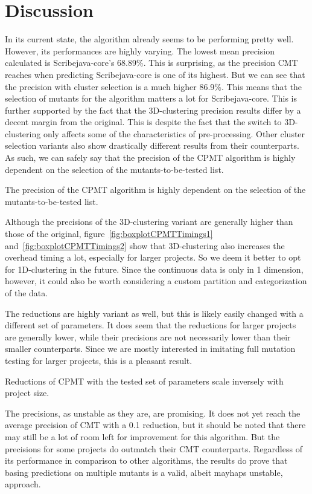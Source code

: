\documentclass[twoside]{uva-inf-bachelor-thesis}
\begin{document}
\section{Discussion}
In its current state, the algorithm already seems to be performing pretty well. However, its performances are highly varying. The lowest mean precision calculated is Scribejava-core's 68.89\%. This is surprising, as the precision CMT reaches when predicting Scribejava-core is one of its highest. But we can see that the precision with cluster selection is a much higher 86.9\%. This means that the selection of mutants for the algorithm matters a lot for Scribejava-core. This is further supported by the fact that the 3D-clustering precision results differ by a decent margin from the original. This is despite the fact that the switch to 3D-clustering only affects some of the characteristics of pre-processing. Other cluster selection variants also show drastically different results from their counterparts. As such, we can safely say that the precision of the CPMT algorithm is highly dependent on the selection of the mutants-to-be-tested list.
\begin{finding}
    The precision of the CPMT algorithm is highly dependent on the selection of the mutants-to-be-tested list.
\end{finding}

Although the precisions of the 3D-clustering variant are generally higher than those of the original, figure~\ref{fig:boxplotCPMTTimings1} and~\ref{fig:boxplotCPMTTimings2} show that 3D-clustering also increases the overhead timing a lot, especially for larger projects. So we deem it better to opt for 1D-clustering in the future. Since the continuous data is only in 1 dimension, however, it could also be worth considering a custom partition and categorization of the data.

The reductions are highly variant as well, but this is likely easily changed with a different set of parameters. It does seem that the reductions for larger projects are generally lower, while their precisions are not necessarily lower than their smaller counterparts. Since we are mostly interested in imitating full mutation testing for larger projects, this is a pleasant result.
\begin{hypothesis}
    Reductions of CPMT with the tested set of parameters scale inversely with project size.
\end{hypothesis}

The precisions, as unstable as they are, are promising. It does not yet reach the average precision of CMT with a 0.1 reduction, but it should be noted that there may still be a lot of room left for improvement for this algorithm. But the precisions for some projects do outmatch their CMT counterparts. Regardless of its performance in comparison to other algorithms, the results do prove that basing predictions on multiple mutants is a valid, albeit mayhaps unstable, approach.
\end{document}
